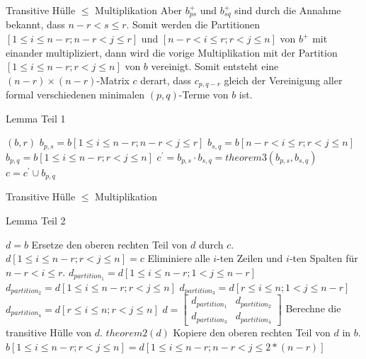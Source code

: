 \documentclass{beamer}
\begin{document}
	\begin{frame}{Transitive Hülle $\le$ Multiplikation}
		Aber $b_{ps}^+$ und $ b_{sq}^+$ sind durch die Annahme bekannt, dass $n-r< s\le r$. Somit werden die Partitionen $[1 \le i \le n-r;n-r < j \le r]$ und $[n-r < i \le r;r < j \le n]$ von $b^+$ mit einander multipliziert, dann wird die vorige Multiplikation mit der Partition $[1 \le i \le n-r; r < j \le n]$ von $b$ vereinigt. Somit entsteht eine $(n-r) \times (n-r)$-Matrix $c$ derart, dass $c_{p,q-r}$ gleich der Vereinigung aller formal verschiedenen minimalen $(p, q)$-Terme von $b$ ist.
			\begin{algorithm}[H]
			\caption{Lemma Teil 1}
			\label{algorithm12}
			\begin{algorithmic}[1]
				\Require $(b, r)$
				\State $b_{p,s} = b[1 \le i \le n-r;n-r < j \le r]$
				\State $b_{s,q} = b[n-r < i \le r;r < j \le n]$
				\State $b_{p,q} = b[1 \le i \le n-r; r < j \le n]$
				\State $c^{'} = b_{p,s} \cdot b_{s,q} = theorem3(b_{p,s},b_{s,q})$
				\State $c = c^{'} \cup b_{p,q}$
			\end{algorithmic}
		\end{algorithm} 
	\end{frame}

	\begin{frame}{Transitive Hülle $\le$ Multiplikation}
			\begin{algorithm}[H]
			\addtocounter{algorithm}{-1}
			\caption{Lemma Teil 2}
			\begin{algorithmic}[1]
				\State $d = b$
				\State Ersetze den oberen rechten Teil von $d$ durch $c$.
				\State $d[1 \le i \le n-r; r < j \le n] = c$
				\State Eliminiere alle $i$-ten Zeilen und $i$-ten Spalten für $n-r < i \le r$.
				\State $d_{partition_1} = d[1 \le i \le n-r; 1 < j \le n-r]$
				\State $d_{partition_2} = d[1 \le i \le n-r; r < j \le n]$
				\State $d_{partition_3} = d[r \le i \le n; 1 < j \le n-r]$
				\State $d_{partition_4} = d[r \le i \le n; r < j \le n]$
				\State $d = 	
				\begin{bmatrix}
					d_{partition_1} & d_{partition_2}\\
					d_{partition_3} & d_{partition_4}
				\end{bmatrix}$
				\State Berechne die transitive Hülle von $d$.
				\State $theorem2(d)$
				\State Kopiere den oberen rechten Teil von $d$ in $b$.
				\State $b[1 \le i \le n-r; r < j \le n] = d[1 \le i \le n-r; n-r < j \le 2*(n-r)]$
			\end{algorithmic}
		\end{algorithm} 
	\end{frame}
\end{document}
